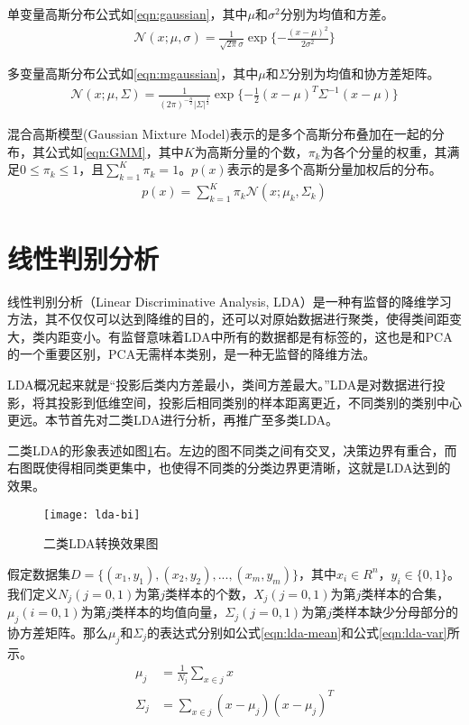 单变量高斯分布公式如\ref{eqn:gaussian}，其中$\mu$和$\sigma^{2}$分别为均值和方差。
\begin{align}
\label{eqn:gaussian}
\mathcal{N}(x; \mu, \sigma) = \frac{1}{\sqrt{2\pi}\sigma}\exp{\{-\frac{(x-\mu)^{2}}{2\sigma^{2}}\}}
\end{align}

多变量高斯分布公式如\ref{eqn:mgaussian}，其中$\mu$和$\Sigma$分别为均值和协方差矩阵。
\begin{align}
\label{eqn:mgaussian}
\mathcal{N}(x; \mu, \Sigma) = \frac{1}{(2\pi)^{-\frac{n}{2}}|\Sigma|^{\frac{1}{2}}}\exp{\{-\frac{1}{2}(x-\mu)^{T}\Sigma^{-1}(x-\mu)\}}
\end{align}

混合高斯模型(Gaussian Mixture Model)表示的是多个高斯分布叠加在一起的分布，其公式如\ref{eqn:GMM}，其中$K$为高斯分量的个数，$\pi_{k}$为各个分量的权重，其满足$0 \leq \pi_{k} \leq 1$，且$\sum_{k=1}^{K}\pi_{k}=1$。$p(x)$表示的是多个高斯分量加权后的分布。
\begin{align}
\label{eqn:GMM}
p(x) = \sum_{k=1}^{K}\pi_{k}\mathcal{N}(x; \mu_{k}, \Sigma_{k})
\end{align}

\section{线性判别分析}
线性判别分析（Linear Discriminative Analysis, LDA）是一种有监督的降维学习方法，其不仅仅可以达到降维的目的，还可以对原始数据进行聚类，使得类间距变大，类内距变小。有监督意味着LDA中所有的数据都是有标签的，这也是和PCA的一个重要区别，PCA无需样本类别，是一种无监督的降维方法。

LDA概况起来就是“投影后类内方差最小，类间方差最大。”LDA是对数据进行投影，将其投影到低维空间，投影后相同类别的样本距离更近，不同类别的类别中心更远。本节首先对二类LDA进行分析，再推广至多类LDA。

二类LDA的形象表述如图\ref{fig:lda-bi}右。左边的图不同类之间有交叉，决策边界有重合，而右图既使得相同类更集中，也使得不同类的分类边界更清晰，这就是LDA达到的效果。
\begin{figure}[htbp]
  \centering
  \texttt{[image: lda-bi]}
  \caption{二类LDA转换效果图 \label{fig:lda-bi}}
\end{figure}

假定数据集$D=\{(x_1, y_1), (x_2, y_2), ..., (x_m, y_m)\}$，其中$x_i \in R^{n}$，$y_i \in \{0, 1\}$。我们定义$N_j (j=0,1)$为第$j$类样本的个数，$X_j (j=0,1)$为第$j$类样本的合集，$\mu_j (i=0,1)$为第$j$类样本的均值向量，$\Sigma_j (j=0,1)$为第$j$类样本缺少分母部分的协方差矩阵。那么$\mu_j$和$\Sigma_j$的表达式分别如公式\ref{eqn:lda-mean}和公式\ref{eqn:lda-var}所示。
\begin{align}
\mu_j &= \frac{1}{N_j} \sum_{x\in{j}} x  \label{eqn:lda-mean}\\
\Sigma_j &= \sum_{x\in{j}} (x-\mu_{j})(x-\mu_{j})^{T} \label{eqn:lda-var}
\end{align}

